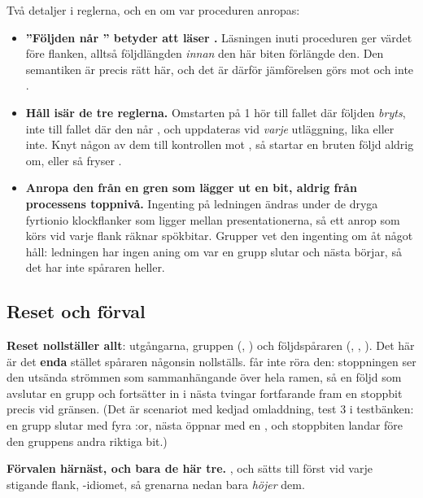 Två detaljer i reglerna, och en om var proceduren anropas:
\begin{itemize}
  \item \textbf{”Följden når ” betyder att  läser
    .} Läsningen inuti proceduren ger värdet före flanken, alltså följdlängden
    \emph{innan} den här biten förlängde den. Den semantiken är precis rätt här, och det är därför
    jämförelsen görs mot  och inte .
  \item \textbf{Håll isär de tre reglerna.} Omstarten på 1 hör till fallet där följden
    \emph{bryts}, inte till fallet där den når , och  uppdateras vid
    \emph{varje} utläggning, lika eller inte. Knyt någon av dem till kontrollen mot ,
    så startar en bruten följd aldrig om, eller så fryser .
  \item \textbf{Anropa den från en gren som lägger ut en bit, aldrig från processens toppnivå.}
    Ingenting på ledningen ändras under de dryga fyrtionio klockflanker som ligger mellan
    presentationerna, så ett anrop som körs vid varje flank räknar spökbitar. Grupper vet den
    ingenting om åt något håll: ledningen har ingen aning om var en grupp slutar och nästa börjar, så
    det har inte spåraren heller.
\end{itemize}

\subsection{Reset och förval}
\label{c14:sub:defaults}

\textbf{Reset nollställer allt}: utgångarna, gruppen (, ) och
följdspåraren (, , ). Det här är det
\textbf{enda} stället spåraren någonsin nollställs.  får inte röra den: stoppningen ser
den utsända strömmen som sammanhängande över hela ramen, så en följd som avslutar en grupp och
fortsätter in i nästa tvingar fortfarande fram en stoppbit precis vid gränsen. (Det är scenariot med
kedjad omladdning, test 3 i testbänken: en grupp slutar med fyra :or, nästa öppnar med en
, och stoppbiten landar före den gruppens andra riktiga bit.)

\textbf{Förvalen härnäst, och bara de här tre.} ,  och  sätts
till  först vid varje stigande flank, -idiomet, så grenarna nedan bara
\emph{höjer} dem.

